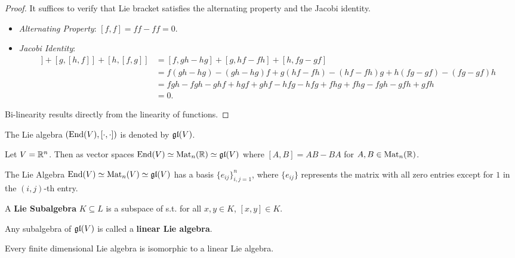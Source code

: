 \documentclass{article}
\begin{document}
\begin{proof}
    It suffices to verify that Lie bracket satisfies the alternating property and the Jacobi identity. 
    \begin{itemize}
        \item \emph{Alternating Property}: $[f, f] = ff - ff = 0$.
        \item \emph{Jacobi Identity}: 
        \begin{align*}
            [f, [g, h]] + [g, [h, f]] + [h, [f, g]] &= [f, gh - hg] + [g, hf - fh] + [h, fg - gf] \\
            &= f(gh - hg) - (gh - hg)f + g(hf - fh) - (hf - fh)g + h(fg - gf) - (fg - gf)h \\
            &= fgh - fgh - ghf + hgf + ghf - hfg - hfg + fhg + fhg - fgh - gfh + gfh \\
            &= 0.
        \end{align*}
    \end{itemize}
    Bi-linearity results directly from the linearity of functions.
\end{proof}

\begin{notation}
    The Lie algebra $(\mathrm{End}(V), [\cdot, \cdot])$ is denoted by $\mathfrak{gl}(V)$.
\end{notation}
\nogap
\begin{example}
    Let $V = \mathbb{R}^n$. Then as vector spaces $\mathrm{End}(V) \simeq \operatorname{Mat}_n(\mathbb{R}) \simeq \mathfrak{gl}(V)$ where $[A, B] = AB - BA$ for $A, B \in \operatorname{Mat}_n(\mathbb{R})$.
\end{example}

The Lie Algebra $\mathrm{End}(V) \simeq \operatorname{Mat}_n(V) \simeq \mathfrak{gl}(V)$ has a basis $\{ e_{ij} \}_{i, j = 1}^n$, where $\{e_{ij}\}$ represents the matrix with all zero entries except for $1$ in the $(i, j)$-th entry.

\begin{definition}
    A \textbf{Lie Subalgebra} $K \subseteq L$ is a subspace of s.t. for all $x, y \in K$, $[x, y] \in K$.
\end{definition}
\nogap
\begin{definition}\label{def: linear lie algebra}
    Any subalgebra of $\mathfrak{gl}(V)$ is called a \textbf{linear Lie algebra}.
\end{definition}

\begin{theorem}\label{thm:ado-iwasawa}
    Every finite dimensional Lie algebra is isomorphic to a linear Lie algebra.
\end{theorem}
\end{document}
